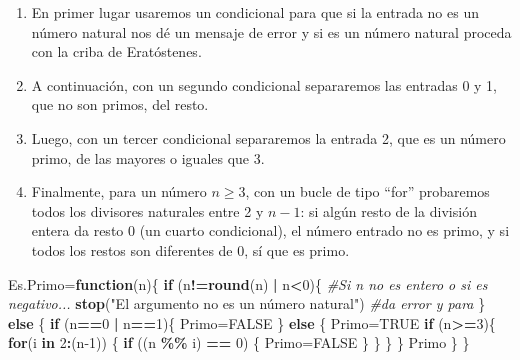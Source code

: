 \documentclass[
]{book}
\newenvironment{Shaded}{\begin{snugshade}}{\end{snugshade}}
\newcommand{\CommentTok}[1]{\textcolor[rgb]{0.56,0.35,0.01}{\textit{#1}}}
\newcommand{\ControlFlowTok}[1]{\textcolor[rgb]{0.13,0.29,0.53}{\textbf{#1}}}
\newcommand{\DecValTok}[1]{\textcolor[rgb]{0.00,0.00,0.81}{#1}}
\newcommand{\KeywordTok}[1]{\textcolor[rgb]{0.13,0.29,0.53}{\textbf{#1}}}
\newcommand{\NormalTok}[1]{#1}
\newcommand{\OperatorTok}[1]{\textcolor[rgb]{0.81,0.36,0.00}{\textbf{#1}}}
\newcommand{\OtherTok}[1]{\textcolor[rgb]{0.56,0.35,0.01}{#1}}
\newcommand{\StringTok}[1]{\textcolor[rgb]{0.31,0.60,0.02}{#1}}
\theoremstyle{definition}
\theoremstyle{definition}
\theoremstyle{definition}
\theoremstyle{remark}
\begin{document}
\begin{enumerate}
\def\labelenumi{\arabic{enumi}.}
\item
  En primer lugar usaremos un condicional para que si la entrada no es un número natural nos dé un mensaje de error y si es un número natural proceda con la criba de Eratóstenes.
\item
  A continuación, con un segundo condicional separaremos las entradas 0 y 1, que no son primos, del resto.
\item
  Luego, con un tercer condicional separaremos la entrada 2, que es un número primo, de las mayores o iguales que 3.
\item
  Finalmente, para un número \(n\geqslant 3\), con un bucle de tipo ``for'' probaremos todos los divisores naturales entre 2 y \(n-1\): si algún resto de la división entera da resto 0 (un cuarto condicional), el número entrado no es primo, y si todos los restos son diferentes de 0, sí que es primo.
\end{enumerate}

\begin{Shaded}
\begin{Highlighting}[]
\NormalTok{Es.Primo=}\ControlFlowTok{function}\NormalTok{(n)\{}
  \ControlFlowTok{if}\NormalTok{ (n}\OperatorTok{!=}\KeywordTok{round}\NormalTok{(n) }\OperatorTok{|}\StringTok{ }\NormalTok{n}\OperatorTok{\textless{}}\DecValTok{0}\NormalTok{)\{ }\CommentTok{\#Si n no es entero o si es negativo...}
    \KeywordTok{stop}\NormalTok{(}\StringTok{"El argumento no es un número natural"}\NormalTok{)  }\CommentTok{\#da error y para}
\NormalTok{  \} }\ControlFlowTok{else}\NormalTok{ \{}
    \ControlFlowTok{if}\NormalTok{ (n}\OperatorTok{==}\DecValTok{0} \OperatorTok{|}\StringTok{ }\NormalTok{n}\OperatorTok{==}\DecValTok{1}\NormalTok{)\{}
\NormalTok{          Primo=}\OtherTok{FALSE}
\NormalTok{    \} }\ControlFlowTok{else}\NormalTok{ \{}
\NormalTok{      Primo=}\OtherTok{TRUE}
      \ControlFlowTok{if}\NormalTok{ (n}\OperatorTok{\textgreater{}=}\DecValTok{3}\NormalTok{)\{}
           \ControlFlowTok{for}\NormalTok{(i }\ControlFlowTok{in} \DecValTok{2}\OperatorTok{:}\NormalTok{(n}\DecValTok{{-}1}\NormalTok{)) \{}
          \ControlFlowTok{if}\NormalTok{ ((n }\OperatorTok{\%\%}\StringTok{ }\NormalTok{i) }\OperatorTok{==}\StringTok{ }\DecValTok{0}\NormalTok{) \{}
\NormalTok{            Primo=}\OtherTok{FALSE}
\NormalTok{          \} }
\NormalTok{\}}
\NormalTok{\}}
\NormalTok{\} }
\NormalTok{Primo}
\NormalTok{\}}
\NormalTok{\}}
\end{Highlighting}
\end{Shaded}
\end{document}
